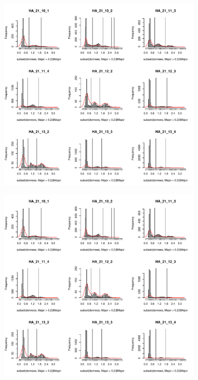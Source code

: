 \begin{figure}[!ht]
   \centering
   \includegraphics[page=1,width=0.9\textwidth]{5_ChapExp3/fig/Hist_trimodaux_supp}
\end{figure}
\begin{figure}[!ht]
    \centering
    \includegraphics[page=2,width=0.9\textwidth]{5_ChapExp3/fig/Hist_trimodaux_supp}
\end{figure}
